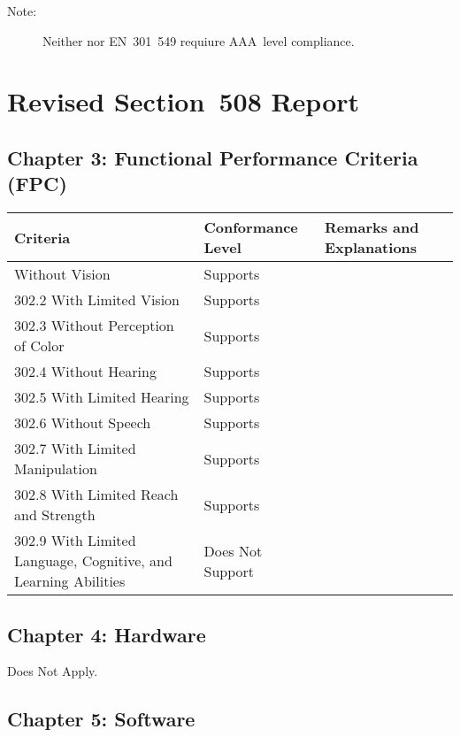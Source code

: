 \documentclass{report}
\begin{document}
\begin{description}
\item[Note:] Neither  nor EN~301~549 requiure
  AAA~level compliance.
\end{description}

\clearpage
\section{Revised Section~508 Report}
\label{sec:sec508}

\subsection{Chapter 3: Functional Performance Criteria (FPC)}
\label{sec:508-3}


\begin{longtable}{p{}<{\RaggedRight}p{}<{\RaggedRight}p{}<{\RaggedRight}}
  \toprule
  Criteria & Conformance Level & Remarks and Explanations \\
  \midrule
  \endhead
  \bottomrule
  \endfoot
  302.1 Without Vision
           & Supports \\ 
  302.2 With Limited Vision & Supports\\
  302.3 Without Perception of Color & Supports\\
  302.4 Without Hearing & Supports\\
  302.5 With Limited Hearing & Supports\\
  302.6 Without Speech & Supports\\
  302.7 With Limited Manipulation & Supports\\
  302.8 With Limited Reach and Strength & Supports\\
  302.9 With Limited Language, Cognitive, and Learning Abilities
           &
             Does Not Support\\                                                                   
\end{longtable}


\subsection{Chapter 4: Hardware}
\label{sec:508-4}


Does Not Apply.

\subsection{Chapter 5: Software}
\label{sec:508-5}
\end{document}
